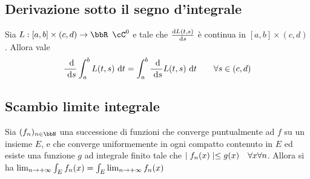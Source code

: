 \documentclass[a4paper,NoNotes,GeneralMath]{stdmdoc}
\begin{document}
	\subsection*{Derivazione sotto il segno d'integrale}
	Sia $L : [a, b] \times (c, d) \rar \bbR$ $\cC^0$ e tale che $\de{L(t, s)}{s}$ è continua in $[a, b] \times (c, d)$. Allora vale
	$$ \dde{s} \int_a^b L(t, s) \de{t} = \int_a^b \dde{s} L(t,s) \de{t} \qquad \forall s \in (c, d) $$
	
	\subsection*{Scambio limite integrale}
	Sia $(f_n)_{n \in \bbN}$ una successione di funzioni che converge puntualmente ad $f$ su un insieme $E$, e che converge uniformemente in ogni compatto contenuto in $E$ ed esiste una funzione $g$ ad integrale finito tale che $\mid f_n(x) \mid \le g(x) \quad \forall x \forall n$. Allora si ha $\lim_{n \rightarrow +\infty} \int_E f_n(x) = \int_E \lim_{n \rightarrow +\infty} f_n(x)$
\end{document}
